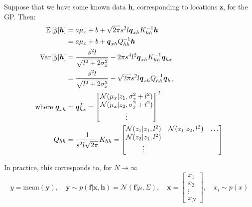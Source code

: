 \documentclass{article}
\begin{document}
Suppose that we have some known data $\boldsymbol{h}$, corresponding to locations $\boldsymbol{z}$, for the GP. Then:
\begin{equation}
    \begin{aligned}
        \mathbb{E}\left[\Tilde{y}|\boldsymbol{h}\right]&=a\mu_x+b+\sqrt{2\pi}s^2l\boldsymbol{q}_{xh}K_{hh}^{-1}\boldsymbol{h} \\
        &=a\mu_x+b+ \boldsymbol{q}_{xh}Q_{hh}^{-1}\boldsymbol{h}\\
        \text{Var}\left[\Tilde{y}|\boldsymbol{h}\right]&=\frac{s^2l}{\sqrt{ l^2+2\sigma_x^2}}-2\pi s^4 l^2 \boldsymbol{q}_{xh}K_{hh}^{-1}\boldsymbol{q}_{hx} \\
        &=\frac{s^2l}{\sqrt{ l^2+2\sigma_x^2}}-\sqrt{2\pi}s^2l\boldsymbol{q}_{xh}Q_{hh}^{-1}\boldsymbol{q}_{hx} \\
        \text{where }\boldsymbol{q}_{xh}&=\boldsymbol{q}_{hx}^T=\begin{bmatrix}
            \mathcal{N}(\mu_x|z_1,\sigma_x^2+l^2) \\
            \mathcal{N}(\mu_x|z_2,\sigma_x^2+l^2) \\
            \vdots
        \end{bmatrix}^T \\
        Q_{hh} &= \frac{1}{s^2 l\sqrt{2\pi}}K_{hh} = \begin{bmatrix}
            \mathcal{N}(z_1|z_1,l^2) & \mathcal{N}(z_1|z_2,l^2) & \hdots \\
            \mathcal{N}(z_2|z_1,l^2) & & \\
            \vdots
        \end{bmatrix}
    \label{eq:output_gaussian}
    \end{aligned}
\end{equation}


In practice, this corresponds to, for $N\rightarrow\infty$
\begin{equation}
    y=\text{mean}(\boldsymbol{y}),\quad \boldsymbol{y}\sim p(\boldsymbol{f}|\boldsymbol{x},\boldsymbol{h})=\mathcal{N}(\boldsymbol{f}|\mu, \Sigma),
    \quad \boldsymbol{x}=\begin{bmatrix}
        x_1 \\ x_2 \\ \vdots \\ x_N
    \end{bmatrix},\quad x_i\sim p(x)
\end{equation}
\end{document}
